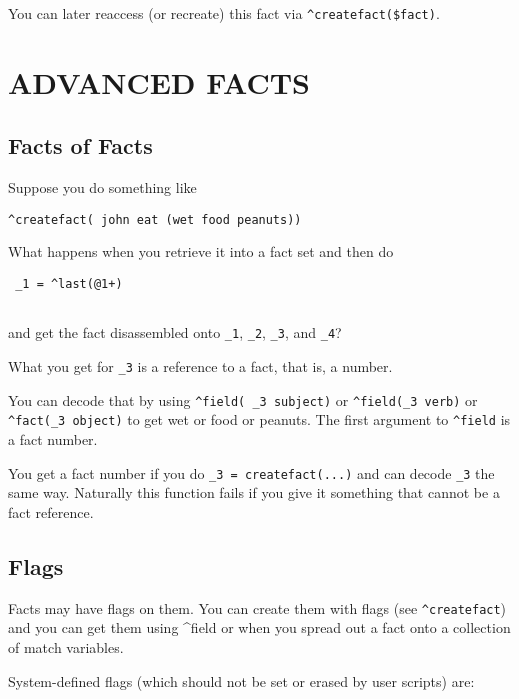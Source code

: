 \documentclass[]{article}
\begin{document}
You can later reaccess (or recreate) this fact via
\texttt{\^{}createfact(\$fact)}.

\section{ADVANCED FACTS}\label{advanced-facts}

\subsection{Facts of Facts}\label{facts-of-facts}

Suppose you do something like

\begin{verbatim}
^createfact( john eat (wet food peanuts))
\end{verbatim}

What happens when you retrieve it into a fact set and then do

\begin{verbatim}
 _1 = ^last(@1+)
 
\end{verbatim}

and get the fact disassembled onto \texttt{\_1}, \texttt{\_2},
\texttt{\_3}, and \texttt{\_4}?

What you get for \texttt{\_3} is a reference to a fact, that is, a
number.

You can decode that by using \texttt{\^{}field(\ \_3\ subject)} or
\texttt{\^{}field(\_3\ verb)} or \texttt{\^{}fact(\_3\ object)} to get
wet or food or peanuts. The first argument to \texttt{\^{}field} is a
fact number.

You get a fact number if you do \texttt{\_3\ =\ createfact(...)} and can
decode \texttt{\_3} the same way. Naturally this function fails if you
give it something that cannot be a fact reference.

\subsection{Flags}\label{flags}

Facts may have flags on them. You can create them with flags (see
\texttt{\^{}createfact}) and you can get them using \^{}field or when
you spread out a fact onto a collection of match variables.

System-defined flags (which should not be set or erased by user scripts)
are:
\end{document}
